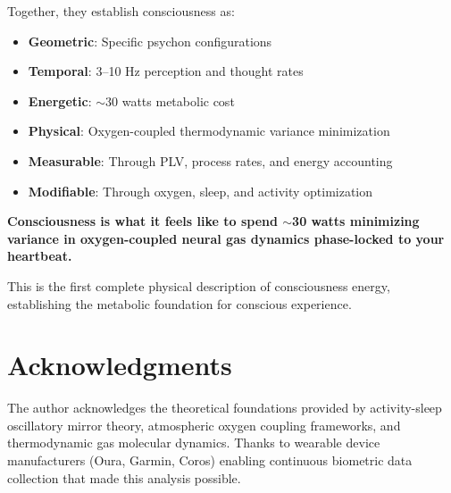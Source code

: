 \documentclass[12pt,twocolumn]{article}
\theoremstyle{remark}
\begin{document}
Together, they establish consciousness as:
\begin{itemize}
\item \textbf{Geometric}: Specific psychon configurations
\item \textbf{Temporal}: 3--10 Hz perception and thought rates
\item \textbf{Energetic}: $\sim$30 watts metabolic cost
\item \textbf{Physical}: Oxygen-coupled thermodynamic variance minimization
\item \textbf{Measurable}: Through PLV, process rates, and energy accounting
\item \textbf{Modifiable}: Through oxygen, sleep, and activity optimization
\end{itemize}

\textbf{Consciousness is what it feels like to spend $\sim$30 watts minimizing variance in oxygen-coupled neural gas dynamics phase-locked to your heartbeat.}

This is the first complete physical description of consciousness energy, establishing the metabolic foundation for conscious experience.

\section*{Acknowledgments}

The author acknowledges the theoretical foundations provided by activity-sleep oscillatory mirror theory, atmospheric oxygen coupling frameworks, and thermodynamic gas molecular dynamics. Thanks to wearable device manufacturers (Oura, Garmin, Coros) enabling continuous biometric data collection that made this analysis possible.
\end{document}
